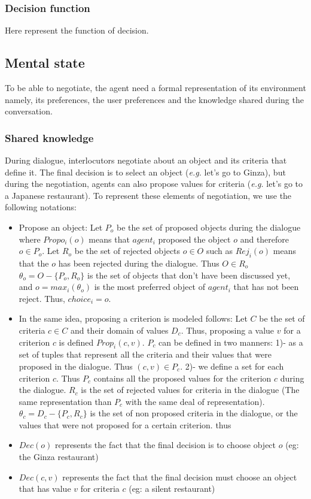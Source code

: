 \documentclass{llncs}
\begin{document}
 \subsubsection{Decision function}
 	Here represent the function of decision.
 \subsection{Mental state}
 To be able to negotiate, the agent need a formal representation of its environment namely, its preferences, the user preferences and the  knowledge shared during the conversation. 
\subsubsection{Shared knowledge}
 
During dialogue, interlocutors  negotiate  about an object and its criteria that define it. The final decision is to select an object (\emph{e.g.} let's go to Ginza), but during the negotiation, agents can also propose values for criteria (\emph{e.g.} let's go to a Japanese restaurant). To represent these elements of negotiation, we use the following notations:
 \begin{itemize}
	 \item Propose an object: 
	 	\subitem Let $P_o$ be the set of proposed objects during the dialogue where $Propo_i(o)$ means that $agent_i$ proposed the object $o$ and therefore $o\in P_o$.
	 	\subitem Let  $R_o$  be the set of rejected objects $o\in O$ such as $Rej_i(o)$ means that the $o$ has been rejected during the dialogue. Thus $O \in R_o$
	 	\subitem $\theta_{o} = O-\{ P_o, R_o\}$ is the set of objects that don't have been discussed yet, and $o=max_i(\theta_{o})$ is the most preferred object of $agent_i$ that has not been reject. Thus, $choice_i= o$.
	\item In the same idea, proposing a criterion is modeled follows:   
		\subitem Let $C$ be the set of criteria $c \in C$ and their domain of values $D_c$. Thus, proposing a value $v$ for a criterion $c$ is defined $Prop_i(c,v)$. 
		\subitem $P_c$ can be defined in two manners: 1)- as a set of tuples that represent all the criteria and their values that were proposed in the dialogue. Thus $(c,v) \in P_c$. 2)- we define a set for each criterion $c$. Thus $P_c$ contains all the proposed values for the criterion $c$ during the dialogue.
		\subitem $R_c$ is the set of rejected values for criteria in the dialogue (The same representation than $P_c$ with the same deal of representation).
		\subitem  $\theta_{c} = D_c - \{P_c, R_c\}$ is the set of non proposed criteria in the dialogue, or the values that were not proposed for a certain criterion. thus 
   
   \item $Dec(o)$ represents the fact that the final decision is to choose object $o$ (eg: the Ginza restaurant)
   \item $Dec(c,v)$ represents the fact that the final decision must choose an object that has value $v$ for criteria $c$ (eg: a silent restaurant)
 \end{itemize}
\end{document}
